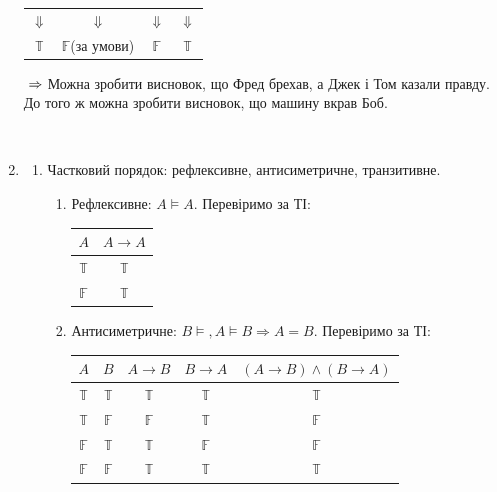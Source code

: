 \documentclass[a4paper,12pt]{article}
\makeatletter
\newcommand{\skipitems}[1]{%
  \addtocounter{\@enumctr}{#1}%
}
\makeatother
\begin{document}
\begin{enumerate}
\begin{table}[htp]
\begin{tabular}{cccc}
$\Downarrow$          & $\Downarrow$                                   & $\Downarrow$                         & $\Downarrow$          \\
$\mathbb{T}$          & \cellcolor[HTML]{FFCCC9}$\mathbb{F}$(за умови) & \cellcolor[HTML]{FFCCC9}$\mathbb{F}$ & $\mathbb{T}$         
\end{tabular}
\end{table}
$\\\Rightarrow $ Можна зробити висновок, що Фред брехав, а Джек і Том казали правду.\\ До того ж можна зробити висновок, що машину вкрав Боб.
\skipitems{1}\\
\item \begin{enumerate} 
\item Частковий порядок: рефлексивне, антисиметричне, транзитивне.
	\begin{enumerate} 
	\item Рефлексивне: $A\models A$. Перевіримо за ТІ: \begin{tabular}{|c|c|}\hline
$A$          & $A\rightarrow A$                     \\\hline
$\mathbb{T}$ & \cellcolor[HTML]{9AFF99}$\mathbb{T}$ \\
$\mathbb{F}$ & \cellcolor[HTML]{9AFF99}$\mathbb{T}$\\\hline 
\end{tabular} 
\item Антисиметричне: $B\models, A\models B\Rightarrow A=B.$ Перевіримо за ТІ:
	\begin{table}[htp]\centering
\begin{tabular}{|c|c|c|c|c|}\hline
$A$          & $B$          & $A\rightarrow B$                     & $B\rightarrow A$                     & $(A\rightarrow B)\land(B\rightarrow A)$ \\\hline
$\mathbb{T}$ & $\mathbb{T}$ & \cellcolor[HTML]{FFFFFF}$\mathbb{T}$ & \cellcolor[HTML]{FFFFFF}$\mathbb{T}$ & \cellcolor[HTML]{9AFF99}$\mathbb{T}$    \\
$\mathbb{T}$ & $\mathbb{F}$ & $\mathbb{F}$                         & $\mathbb{T}$                         & $\mathbb{F}$                            \\
$\mathbb{F}$ & $\mathbb{T}$ & $\mathbb{T}$                         & $\mathbb{F}$                         & $\mathbb{F}$                            \\
$\mathbb{F}$ & $\mathbb{F}$ & \cellcolor[HTML]{FFFFFF}$\mathbb{T}$ & \cellcolor[HTML]{FFFFFF}$\mathbb{T}$ & \cellcolor[HTML]{9AFF99}$\mathbb{T}$   \\\hline
\end{tabular}
\end{table}


\end{enumerate}
\end{enumerate}
\end{enumerate}
\end{document}
